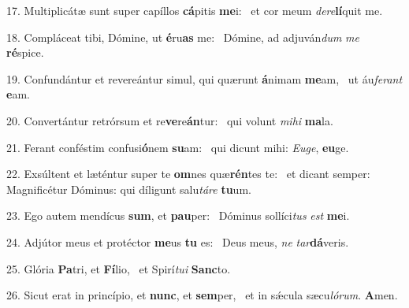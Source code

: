 17. Multiplicátæ sunt super capíllos \textbf{cá}pitis \textbf{me}i: \ast\  et cor meum \textit{de}\textit{re}\textbf{lí}quit me.\

18. Compláceat tibi, Dómine, ut \textbf{é}ru\textbf{as} me: \ast\  Dómine, ad adjuván\textit{dum} \textit{me} \textbf{ré}spice.\

19. Confundántur et revereántur simul, qui quærunt \textbf{á}nimam \textbf{me}am, \ast\  ut áu\textit{fe}\textit{rant} \textbf{e}am.\

20. Convertántur retrórsum et re\textbf{ve}re\textbf{án}tur: \ast\  qui volunt \textit{mi}\textit{hi} \textbf{ma}la.\

21. Ferant conféstim confusi\textbf{ó}nem \textbf{su}am: \ast\  qui dicunt mihi: \textit{Eu}\textit{ge}, \textbf{eu}ge.\

22. Exsúltent et læténtur super te \textbf{om}nes quæ\textbf{rén}tes te: \ast\  et dicant semper: Magnificétur Dóminus: qui díligunt salu\textit{tá}\textit{re} \textbf{tu}um.\

23. Ego autem mendícus \textbf{sum}, et \textbf{pau}per: \ast\  Dóminus sollíci\textit{tus} \textit{est} \textbf{me}i.\

24. Adjútor meus et protéctor \textbf{me}us \textbf{tu} es: \ast\  Deus meus, \textit{ne} \textit{tar}\textbf{dá}veris.\

25. Glória \textbf{Pa}tri, et \textbf{Fí}lio, \ast\  et Spirí\textit{tu}\textit{i} \textbf{Sanc}to.\

26. Sicut erat in princípio, et \textbf{nunc}, et \textbf{sem}per, \ast\  et in sǽcula sæcu\textit{ló}\textit{rum}. \textbf{A}men.\

